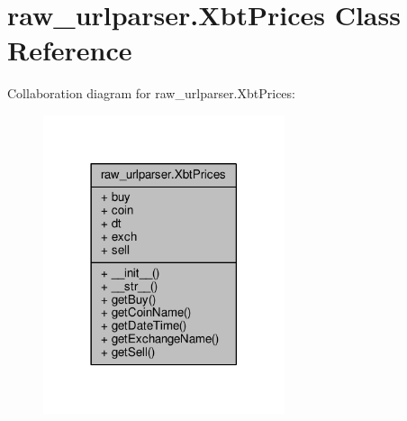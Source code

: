 \hypertarget{classraw__urlparser_1_1_xbt_prices}{}\section{raw\+\_\+urlparser.\+Xbt\+Prices Class Reference}
\label{classraw__urlparser_1_1_xbt_prices}


Collaboration diagram for raw\+\_\+urlparser.\+Xbt\+Prices\+:\nopagebreak
\begin{figure}[H]
\begin{center}
\leavevmode
\includegraphics[width=201pt]{classraw__urlparser_1_1_xbt_prices__coll__graph}
\end{center}
\end{figure}

